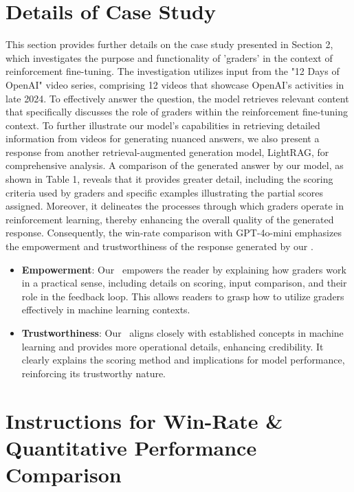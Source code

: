 \section{Details of Case Study}\label{apd:case study}
This section provides further details on the case study presented in Section 2, which investigates the purpose and functionality of 'graders' in the context of reinforcement fine-tuning. The investigation utilizes input from the "12 Days of OpenAI" video series, comprising 12 videos that showcase OpenAI's activities in late 2024. To effectively answer the question, the model retrieves relevant content that specifically discusses the role of graders within the reinforcement fine-tuning context. To further illustrate our model's capabilities in retrieving detailed information from videos for generating nuanced answers, we also present a response from another retrieval-augmented generation model, LightRAG, for comprehensive analysis. A comparison of the generated answer by our model, as shown in Table 1, reveals that it provides greater detail, including the scoring criteria used by graders and specific examples illustrating the partial scores assigned. Moreover, it delineates the processes through which graders operate in reinforcement learning, thereby enhancing the overall quality of the generated response. Consequently, the win-rate comparison with GPT-4o-mini emphasizes the empowerment and trustworthiness of the response generated by our \model.
\vspace{-0.05in}
\begin{itemize}[leftmargin=*]

    \item \textbf{Empowerment}: Our \model\ empowers the reader by explaining how graders work in a practical sense, including details on scoring, input comparison, and their role in the feedback loop. This allows readers to grasp how to utilize graders effectively in machine learning contexts.
    
    \item \textbf{Trustworthiness}: Our \model\ aligns closely with established concepts in machine learning and provides more operational details, enhancing credibility. It clearly explains the scoring method and implications for model performance, reinforcing its trustworthy nature.
\end{itemize}
\vspace{-0.1in}



\section{Instructions for Win-Rate \& Quantitative Performance Comparison}\label{apd:prompt4evaluation}

